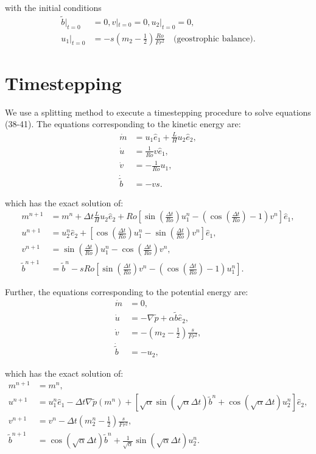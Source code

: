 \documentclass[11pt, oneside]{article}   	%
\newcommand{\eone}{\hat{e}_1}
\newcommand{\etwo}{\hat{e}_2}
\newcommand{\bt}{\tilde{b}}
\newcommand{\pt}{\tilde{p}}
\newcommand{\dt}{\Delta t}
\begin{document}
with the initial conditions
\begin{align} 
\bt |_{t=0} &= 0, v |_{t=0} = 0, u_2 |_{t=0} = 0, \\
u_1 |_{t=0} &= -s (m_2 - \frac{1}{2}) \frac{Ro}{Fr^2} \quad \text{(geostrophic balance)}.
\end{align}



\section{Timestepping}

We use a splitting method to execute a timestepping procedure to solve equations (38-41). The equations corresponding to the kinetic energy are:
\begin{align} 
\dot{m} &= u_1 \eone +  \frac{L}{H} u_2 \etwo, \\
\dot{u} &= \frac{1}{Ro} v \eone, \\
\dot{v} &= -\frac{1}{Ro} u_1, \\
\dot{\bt} &= -v s.
\end{align}

which has the exact solution of:
\begin{align} 
m^{n+1} &= m^n + \dt \frac{L}{H} u_2 \etwo + Ro [\sin(\frac{\dt}{Ro}) u_1^n - (\cos(\frac{\dt}{Ro}) - 1) v^n] \eone, \\
u^{n+1} &= u_2^n \etwo + [\cos(\frac{\dt}{Ro}) u_1^n - \sin(\frac{\dt}{Ro}) v^n] \eone, \\
v^{n+1} &= \sin(\frac{\dt}{Ro}) u_1^n - \cos(\frac{\dt}{Ro}) v^n, \\
\bt^{n+1} &= \bt^n - sRo[\sin(\frac{\dt}{Ro}) v^n - (\cos(\frac{\dt}{Ro}) - 1) u_1^n].
\end{align}

Further, the equations corresponding to the potential energy are:
\begin{align} 
\dot{m} &= 0, \\
\dot{u} &= - \nabla \pt + \alpha \bt \etwo, \\
\dot{v} &= - (m_2 - \frac{1}{2}) \frac{s}{Fr^2}, \\
\dot{\bt} &= -u_2,
\end{align}

which has the exact solution of:
\begin{align} 
m^{n+1} &= m^n, \\
u^{n+1} &=  u_1^n \eone - \dt \nabla \pt(m^n) + [\sqrt{\alpha} \sin(\sqrt{\alpha} \dt)  \bt^n + \cos(\sqrt{\alpha} \dt) u_2^n] \etwo, \\
v^{n+1} &= v^n - \dt (m_2^n - \frac{1}{2})\frac{s}{Fr^2}, \\
\bt^{n+1} &= \cos(\sqrt{\alpha} \dt)  \bt^n + \frac{1}{\sqrt{\alpha}} \sin(\sqrt{\alpha} \dt) u_2^n.
\end{align}
\end{document}
